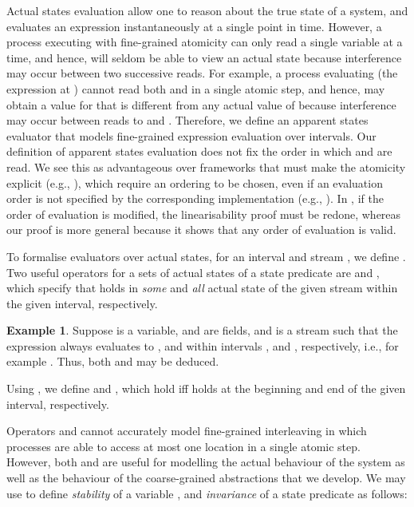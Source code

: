 \documentclass{article}
\theoremstyle{plain}
\theoremstyle{definition}
\newtheorem{example}{Example}[section]
\begin{document}
Actual states evaluation allow one to reason about the true state of a
system, and evaluates an expression instantaneously at a single point
in time. However, a process executing with fine-grained atomicity can
only read a single variable at a time, and hence, will seldom be able
to view an actual state because interference may occur between two
successive reads. For example, a process  evaluating  (the
expression at ) cannot read both  and
 in a single atomic step, and hence, may obtain a
value for  that is different from any actual value of 
because interference may occur between reads to  and
. Therefore, we define an apparent states evaluator
that models fine-grained expression evaluation over intervals. Our
definition of apparent states evaluation does not fix the order in
which  and  are read. We see this as
advantageous over frameworks that must make the atomicity explicit
(e.g., \cite{VHHS06,CGLM06,DSW11}), which require an ordering to be
chosen, even if an evaluation order is not specified by the
corresponding implementation (e.g., \cite{HHLMSS07}). In
\cite{VHHS06,CGLM06,DSW11}, if the order of evaluation is modified,
the linearisability proof must be redone, whereas our proof is more
general because it shows that any order of evaluation is valid.










\smallskip

To formalise evaluators over actual states, for an interval 
and stream , we define . Two useful operators for a sets of actual states of a state
predicate  are  and , which specify that
 holds in \emph{some} and \emph{all} actual state of the given
stream within the given interval, respectively. 


\begin{example} \label{ex:uv} Suppose  is a variable,  and 
  are fields, and  is a stream such that the expression  always evaluates to ,  and  within intervals ,  and
  , respectively, i.e., for example . Thus, both  and  may be deduced.
\end{example}

Using , we define  and , which hold iff 
holds at the beginning and end of the given interval, respectively. 

Operators  and  cannot accurately model
fine-grained interleaving in which processes are able to access at
most one location in a single atomic step. However, both  and
 are useful for modelling the actual behaviour of the
system as well as the behaviour of the coarse-grained abstractions
that we develop. We may use  to define \emph{stability} of a
variable , and \emph{invariance} of a state predicate  as
follows:
\end{document}
